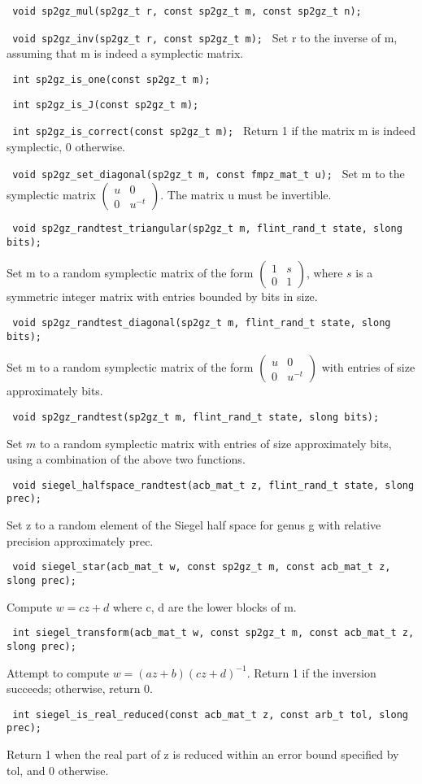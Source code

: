 \documentclass{article}
\newcommand{\code}[1]{\lstinline:#1:}
\newcommand{\fun}[1]{\vspace{2mm}\noindent \code{#1}}
\newcommand{\mat}[4]{\left(\begin{matrix}#1&#2\\#3&#4\end{matrix}\right)}
\begin{document}
\fun{
void sp2gz_mul(sp2gz_t r, const sp2gz_t m, const sp2gz_t n);
}

\fun{
void sp2gz_inv(sp2gz_t r, const sp2gz_t m);
}
Set r to the inverse of m, assuming that m is indeed a symplectic matrix.

\fun{
int sp2gz_is_one(const sp2gz_t m);
}

\fun{
int sp2gz_is_J(const sp2gz_t m);
}

\fun{
int sp2gz_is_correct(const sp2gz_t m);
}
Return 1 if the matrix m is indeed symplectic, 0 otherwise.

\fun{
void sp2gz_set_diagonal(sp2gz_t m, const fmpz_mat_t u);
}
Set m to the symplectic matrix $\mat{u}{0}{0}{u^{-t}}$. The matrix u must be invertible.

\fun{
void sp2gz_randtest_triangular(sp2gz_t m, flint_rand_t state, slong bits);
}

Set m to a random symplectic matrix of the form $\mat{1}{s}{0}{1}$,
where $s$ is a symmetric integer matrix with entries bounded by bits
in size.

\fun{
void sp2gz_randtest_diagonal(sp2gz_t m, flint_rand_t state, slong bits);
}

Set m to a random symplectic matrix of the form
$\mat{u}{0}{0}{u^{-t}}$ with entries of size approximately bits.

\fun{
void sp2gz_randtest(sp2gz_t m, flint_rand_t state, slong bits);
}

Set $m$ to a random symplectic matrix with entries of size
approximately bits, using a combination of the above two functions.

\fun{
void siegel_halfspace_randtest(acb_mat_t z, flint_rand_t state, slong prec);
}

Set z to a random element of the Siegel half space for genus g with
relative precision approximately prec.

\fun{
void siegel_star(acb_mat_t w, const sp2gz_t m, const acb_mat_t z, slong prec);
}

Compute $w = cz+d$ where c, d are the lower blocks of m.

\fun{
int siegel_transform(acb_mat_t w, const sp2gz_t m, const acb_mat_t z, slong prec);
}

Attempt to compute $w = (az+b)(cz+d)^{-1}$. Return 1 if the inversion
succeeds; otherwise, return 0.

\fun{
int siegel_is_real_reduced(const acb_mat_t z, const arb_t tol, slong prec);
}

Return 1 when the real part of z is reduced within an error bound
specified by tol, and 0 otherwise.
\end{document}
